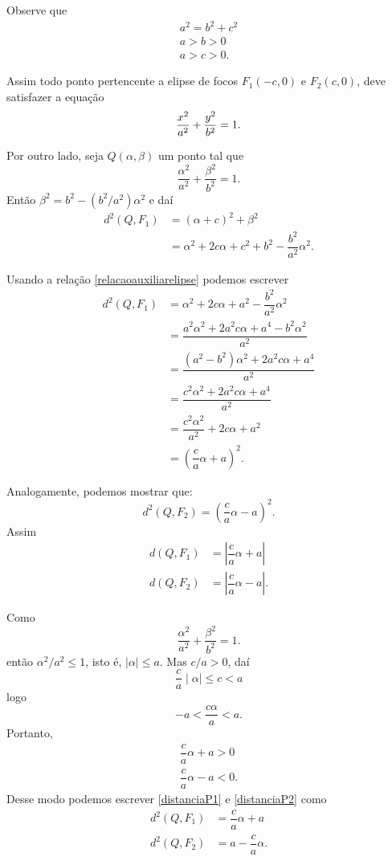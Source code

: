Observe que
\begin{align}
    a^2 = b^2 + c^2 \\
    a > b > 0       \\
    a > c > 0.
\end{align}

Assim todo ponto pertencente a elipse de focos $F_1(-c,0)$ e $F_2(c,0)$, deve satisfazer a equação
\[
    \dfrac{x^2}{a^2} + \dfrac{y^2}{b^2} = 1.
\]

Por outro lado, seja $Q(\alpha,\beta)$ um ponto tal que
\[
    \dfrac{\alpha^2}{a^2} + \dfrac{\beta^2}{b^2} = 1.
\]
Então $\beta^2 = b^2 - (b^2/a^2)\alpha^2$ e daí
\begin{align*}
    d^2(Q,F_1) & = (\alpha + c)^2 + \beta^2                                    \\
               & = \alpha^2 + 2c\alpha + c^2 + b^2 - \dfrac{b^2}{a^2}\alpha^2.
\end{align*}

Usando a relação \eqref{relacaoauxiliarelipse} podemos escrever
\begin{align*}
    d^2(Q,F_1) & = \alpha^2 + 2c\alpha + a^2 - \dfrac{b^2}{a^2}\alpha^2       \\
               & = \dfrac{a^2\alpha^2 + 2a^2c\alpha + a^4 - b^2\alpha^2}{a^2} \\
               & = \dfrac{(a^2 - b^2)\alpha^2 + 2a^2c\alpha + a^4}{a^2}       \\
               & = \dfrac{c^2\alpha^2 + 2a^2c\alpha + a^4}{a^2}               \\
               & = \dfrac{c^2\alpha^2}{a^2} + 2c\alpha + a^2                  \\
               & = \left(\dfrac{c}{a}\alpha + a\right)^2.
\end{align*}

Analogamente, podemos mostrar que:
\begin{equation*}
    d^2(Q,F_2) = \left(\dfrac{c}{a}\alpha - a\right)^2.
\end{equation*}
Assim
\begin{align}
    d(Q,F_1) & = \left|\dfrac{c}{a}\alpha + a\right|\label{distanciaP1}  \\
    d(Q,F_2) & = \left|\dfrac{c}{a}\alpha - a\right|\label{distanciaP2}.
\end{align}

Como
\[
    \dfrac{\alpha^2}{a^2} + \dfrac{\beta^2}{b^2} = 1.
\]
então $\alpha^2/a^2 \le 1$, isto é, $\mid\alpha\mid\le a$. Mas $c/a > 0$, daí
\[
    \dfrac{c}{a}\mid\alpha\mid \le c < a
\]
logo
\[
    -a < \dfrac{c\alpha}{a} < a.
\]
Portanto,
\begin{align*}
    \dfrac{c}{a}\alpha + a > 0 \\
    \dfrac{c}{a}\alpha - a < 0.
\end{align*}
Desse modo podemos escrever \eqref{distanciaP1} e \eqref{distanciaP2} como
\begin{align*}
    d^2(Q,F_1) & = \dfrac{c}{a}\alpha + a  \\
    d^2(Q,F_2) & = a - \dfrac{c}{a}\alpha.
\end{align*}


